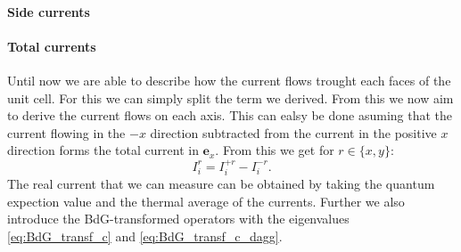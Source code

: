 \documentclass[../main.tex]{subfile}
\begin{document}
\paragraph{Side currents}


\paragraph{Total currents}
Until now we are able to describe how the current flows trought each faces of the unit cell. For this we can simply split the term we derived.
From this we now aim to derive the current flows on each axis.
This can ealsy be done asuming that the current flowing in the $-x$ direction subtracted from the current in the positive $x$ direction forms the total current in $\bm{e}_x$.
From this we get for $r\in\{x,y\}$:
\[
    I_{i}^{r} = I_{i}^{+r} - I_{i}^{-r}.
\]
The real current that we can measure can be obtained by taking the quantum expection value and the thermal average of the currents. Further we also introduce the 
BdG-transformed operators with the eigenvalues \ref{eq:BdG_transf_c} and \ref{eq:BdG_transf_c_dagg}. \\
\end{document}
